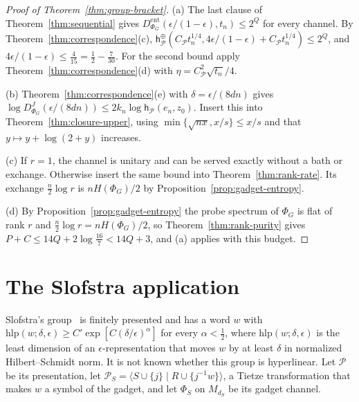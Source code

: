 \documentclass[11pt,a4paper]{article}
\theoremstyle{plain}
\theoremstyle{definition}
\theoremstyle{remark}
\newcommand{\DChoi}{D^{J}}
\begin{document}
\begin{proof}[Proof of Theorem~\ref{thm:group-bracket}]
(a) The last clause of Theorem~\ref{thm:sequential} gives $D^{\mathrm{ent}}_{\Phi_G}(\epsilon/(1-\epsilon),t_n)\le2^Q$ for every channel. By
Theorem~\ref{thm:correspondence}(c), $\mathsf h^\oplus_{\mathcal P}(C_{\mathcal P}t_n^{1/4},4\epsilon/(1-\epsilon)+C_{\mathcal P}t_n^{1/4})\le2^Q$, and
$4\epsilon/(1-\epsilon)\le\frac4{15}=\frac12-\frac7{30}$. For the second bound apply Theorem~\ref{thm:correspondence}(d) with $\eta=C_{\mathcal P}^2\sqrt{t_n}/4$.

(b) Theorem~\ref{thm:correspondence}(e) with $\delta=\epsilon/(8dn)$ gives $\log\DChoi_{\Phi_G}(\epsilon/(8dn))\le2k_n\log\mathsf h_{\mathcal P}(e_n,z_0)$. Insert this into
Theorem~\ref{thm:closure-upper}, using $\min\{\sqrt{nx},x/s\}\le x/s$ and that $y\mapsto y+\log(2+y)$ increases.

(c) If $r=1$, the channel is unitary and can be served exactly without a bath or exchange. Otherwise insert the same bound into
Theorem~\ref{thm:rank-rate}. Its exchange $\frac n2\log r$ is $nH(\Phi_G)/2$ by Proposition~\ref{prop:gadget-entropy}.

(d) By Proposition~\ref{prop:gadget-entropy} the probe spectrum of $\Phi_G$ is flat of rank $r$ and $\frac n2\log r=nH(\Phi_G)/2$, so
Theorem~\ref{thm:rank-purity} gives $P+C\le14Q+2\log\frac{16}7<14Q+3$, and (a) applies with this budget.
\end{proof}


\section{The Slofstra application}\label{sec:slofstra}


Slofstra's group~\cite[Theorem~1.2]{Slofstra2018} is finitely presented and has a word $w$ with $\mathrm{hlp}(w;\delta,\epsilon)\ge C'\exp[C(\delta/\epsilon)^\alpha]$ for every
$\alpha<\frac12$, where $\mathrm{hlp}(w;\delta,\epsilon)$ is the least dimension of an $\epsilon$-representation that moves $w$ by at least $\delta$ in normalized
Hilbert--Schmidt norm. It is not known whether this group is hyperlinear. Let $\mathcal P$ be its presentation, let
$\mathcal P_S=\langle S\cup\{j\}\mid R\cup\{j^{-1}w\}\rangle$, a Tietze transformation that makes $w$ a symbol of the gadget, and let $\Phi_S$ on $M_{d_S}$ be its
gadget channel.
\end{document}
